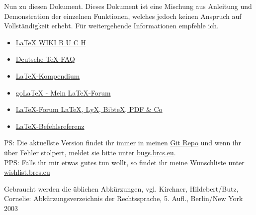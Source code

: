 \documentclass[oneside, headings=small,headsepline,12pt, a4paper, numbers=noenddot, chapterprefix=false]{scrreprt}
\begin{document}
Nun zu diesen Dokument. Dieses Dokument ist eine Mischung aus Anleitung und Demonstration der einzelnen Funktionen, welches jedoch keinen Anspruch auf Vollständigkeit erhebt. Für weitergehende Informationen empfehle ich.
\begin{itemize}
	\item \href{http://www.linupedia.org/opensuse/LaTeX}{LaTeX WIKI B U C H}
	\item \href{http://projekte.dante.de/DanteFAQ/WebHome}{Deutsche TeX-FAQ}
	\item \href{http://de.wikibooks.org/wiki/LaTeX-Kompendium}{LaTeX-Kompendium}
	\item \href{http://golatex.de/}{goLaTeX - Mein LaTeX-Forum}
	\item \href{http://mrunix.de/forums/forumdisplay.php?f=38}{LaTeX-Forum LaTeX, LyX, BibteX, PDF \& Co}
	\item \href{http://www.weinelt.de/latex/index.html}{LaTeX-Befehlsreferenz}
\end{itemize}

PS: Die aktuellste Version findet ihr immer in meinen \href{https://github.com/BlackRocket/LaTeX-Script-Vorlage}{Git Repo} und wenn ihr über Fehler stolpert, meldet sie bitte unter \href{http://bugs.brcs.eu/index.php?project=2}{bugs.brcs.eu}.  
\\

PPS: Falls ihr mir etwas gutes tun wollt, so findet ihr meine Wunschliste unter \href{http://wishlist.brcs.eu}{wishlist.brcs.eu}
\clearpage

\setcounter{tocdepth}{3}
\tableofcontents

\nocite{*} %


Gebraucht werden die üblichen Abkürzungen, vgl. Kirchner,
Hildebert/Butz, Cornelie: Abkürzungsverzeichnis der Rechtssprache, 5.
Aufl., Berlin/New York 2003

\clearpage

\endgroup


\end{document}
